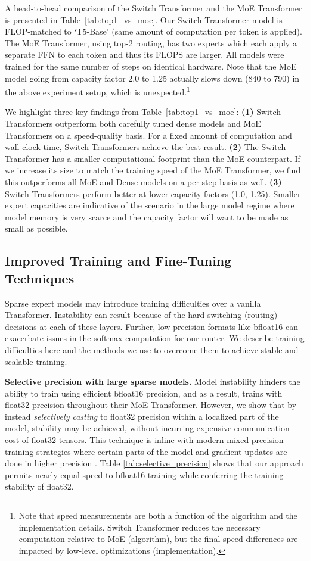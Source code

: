 \documentclass[twoside,11pt]{article}
\begin{document}
A head-to-head comparison of the Switch Transformer and the MoE Transformer is presented in Table~\ref{tab:top1_vs_moe}.
Our Switch Transformer model is FLOP-matched to `T5-Base' \citep{raffel2019exploring} (same amount of computation per token is applied).
The MoE Transformer, using top-2 routing, has two experts which each apply a separate FFN to each token and thus its FLOPS are larger. 
All models were trained for the same number of steps on identical hardware. Note that the MoE model going from capacity factor 2.0 to 1.25 actually slows down (840 to 790) in the above experiment setup, which is unexpected.\footnote{Note that speed measurements are both a function of the algorithm and the implementation details. Switch Transformer reduces the necessary computation relative to MoE (algorithm), but the final speed differences are impacted by low-level optimizations (implementation).}

We highlight three key findings from Table~\ref{tab:top1_vs_moe}: \textbf{(1)} Switch Transformers outperform both carefully tuned dense models and MoE Transformers on a speed-quality basis.
For a fixed amount of computation and wall-clock time, Switch Transformers achieve the best result. 
\textbf{(2)} The Switch Transformer has a smaller computational footprint than the MoE counterpart. If we increase its size to match the training speed of the MoE Transformer, we find this outperforms all MoE and Dense models on a per step basis as well.
\textbf{(3)} Switch Transformers perform better at lower capacity factors (1.0, 1.25).
Smaller expert capacities are indicative of the scenario in the large model regime where model memory is very scarce and the capacity factor will want to be made as small as possible.


\subsection{Improved Training and Fine-Tuning Techniques}
Sparse expert models may introduce training difficulties over a vanilla Transformer.
Instability can result because of the hard-switching (routing) decisions at each of these layers.
Further, low precision formats like bfloat16 \citep{wang2019bfloat16} can exacerbate issues in the softmax computation for our router.
We describe training difficulties here and the methods we use to overcome them to achieve stable and scalable training.

\textbf{Selective precision with large sparse models.} 
Model instability hinders the ability to train using efficient bfloat16 precision, and as a result, \citet{lepikhin2020gshard} trains with float32 precision throughout their MoE Transformer.
However, we show that by instead \emph{selectively casting} to float32 precision within a localized part of the model, stability may be achieved, without incurring expensive communication cost of float32 tensors. This technique is inline with modern mixed precision training strategies where certain parts of the model and gradient updates are done in higher precision \cite{micikevicius2017mixed}.
Table \ref{tab:selective_precision} shows that our approach permits nearly equal speed to bfloat16 training while conferring the training stability of float32.
\end{document}
